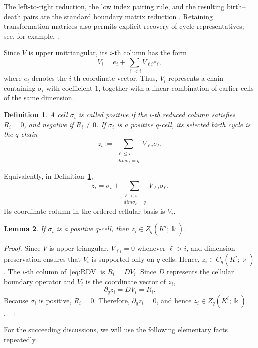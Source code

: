 \documentclass[11pt]{article}
\theoremstyle{paperdefinition}
\newtheorem{definition}{Definition}[section]
\theoremstyle{paperplain}
\newtheorem{lemma}[definition]{Lemma}
\theoremstyle{paperremark}
\begin{document}
The left-to-right reduction, the low index pairing rule, and the resulting birth--death pairs are the standard boundary matrix reduction \cite{edelsbrunner2002topological,zomorodian2005computing}. Retaining transformation matrices also permits explicit recovery of cycle representatives; see, for example, \cite{hang2021umatch}.

Since $V$ is upper unitriangular, its $i$-th column has the form
\[
V_i = e_i+\sum_{\ell<i}V_{\ell i}e_\ell,
\]
where $e_i$ denotes the $i$-th coordinate vector. Thus, $V_i$ represents a chain containing $\sigma_i$ with coefficient $1$, together with a linear combination of earlier cells of the same dimension.

\begin{definition}
\label{def:positive-cells}
A cell $\sigma_i$ is called \emph{positive} if the $i$-th reduced column satisfies $R_i=0$, and \emph{negative} if $R_i\neq0$. If $\sigma_i$ is a positive $q$-cell, its \emph{selected birth cycle} is the $q$-chain
\begin{equation}
\label{eq:selected-birth-cycle}
z_i := \sum_{\substack{\ell\leq i\\dim\sigma_\ell=q}}V_{\ell i}\sigma_\ell.
\end{equation}
\end{definition}

Equivalently, in Definition~\ref{def:positive-cells},
\[
z_i = \sigma_i+ \sum_{\substack{\ell<i\\dim\sigma_\ell=q}}V_{\ell i}\sigma_\ell.
\]
Its coordinate column in the ordered cellular basis is $V_i$.

\begin{lemma}
\label{lem:selected-representative-cycle}
If $\sigma_i$ is a positive $q$-cell, then $z_i \in Z_q(K^i;\Bbbk)$.
\end{lemma}

\begin{proof}
Since $V$ is upper triangular, $V_{\ell i}=0$ whenever $\ell>i$, and dimension preservation ensures that $V_i$ is supported only on $q$-cells. Hence, $z_i\in C_q(K^i;\Bbbk)$. The $i$-th column of~\eqref{eq:RDV} is $R_i=DV_i$. Since $D$ represents the cellular boundary operator and $V_i$ is the coordinate vector of $z_i$,
\[
\partial_q z_i=DV_i=R_i.
\]
Because $\sigma_i$ is positive, $R_i=0$. Therefore, $\partial_qz_i=0$, and hence $z_i\in Z_q(K^i;\Bbbk)$.
\end{proof}

For the succeeding discussions, we will use the following elementary facts repeatedly.
\end{document}
